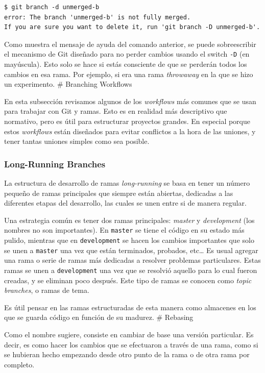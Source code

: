 \begin{lstlisting}
$ git branch -d unmerged-b
error: The branch 'unmerged-b' is not fully merged.
If you are sure you want to delete it, run 'git branch -D unmerged-b'.
\end{lstlisting}

Como muestra el mensaje de ayuda del comando anterior, se puede
sobreescribir el mecanismo de Git diseñado para no perder cambios usando
el switch \passthrough{\lstinline!-D!} (en mayúscula). Esto solo se hace
si estás consciente de que se perderán todos los cambios en esa rama.
Por ejemplo, si era una rama \emph{throwaway} en la que se hizo un
experimento. \# Branching Workflows

En esta subsección revisamos algunos de los \emph{workflows} más comunes
que se usan para trabajar con Git y ramas. Esto es en realidad más
descriptivo que normativo, pero es útil para estructurar proyectos
grandes. En especial porque estos \emph{workflows} están diseñados para
evitar conflictos a la hora de las uniones, y tener tantas uniones
simples como sea posible.

\subsubsection{Long-Running Branches}

La estructura de desarrollo de ramas \emph{long-running} se basa en
tener un número pequeño de ramas principales que siempre están abiertas,
dedicadas a las diferentes etapas del desarrollo, las cuales se unen
entre si de manera regular.

Una estrategia común es tener dos ramas principales: \emph{master} y
\emph{development} (los nombres no son importantes). En
\passthrough{\lstinline!master!} se tiene el código en su estado más
pulido, mientras que en \passthrough{\lstinline!development!} se hacen
los cambios importantes que solo se unen a
\passthrough{\lstinline!master!} una vez que están terminados, probados,
etc\ldots{} Es usual agregar una rama o serie de ramas más dedicadas a
resolver problemas particulares. Estas ramas se unen a
\passthrough{\lstinline!development!} una vez que se resolvió aquello
para lo cual fueron creadas, y se eliminan poco después. Este tipo de
ramas se conocen como \emph{topic branches}, o ramas de tema.

Es útil pensar en las ramas estructuradas de esta manera como almacenes
en los que se guarda código en función de su madurez. \# Rebasing

Como el nombre sugiere, consiste en cambiar de base una versión
particular. Es decir, es como hacer los cambios que se efectuaron a
través de una rama, como si se hubieran hecho empezando desde otro punto
de la rama o de otra rama por completo.

